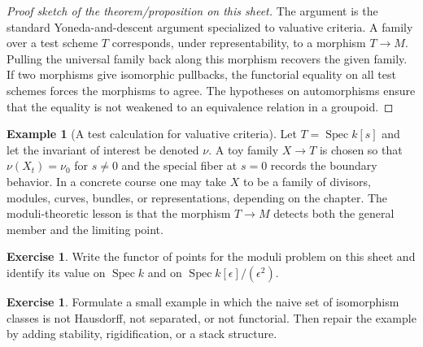 \documentclass[11pt]{amsart}
\theoremstyle{definition}
\newtheorem{example}[theorem]{Example}
\newtheorem{exercise}[theorem]{Exercise}
\newcommand{\Spec}{\operatorname{Spec}}
\begin{document}
\begin{proof}[Proof sketch of the theorem/proposition on this sheet]
The argument is the standard Yoneda-and-descent argument specialized to valuative criteria.  A family over a test scheme $T$ corresponds, under representability, to a morphism $T\to M$.  Pulling the universal family back along this morphism recovers the given family.  If two morphisms give isomorphic pullbacks, the functorial equality on all test schemes forces the morphisms to agree.  The hypotheses on automorphisms ensure that the equality is not weakened to an equivalence relation in a groupoid.
\end{proof}
\begin{example}[A test calculation for valuative criteria]
Let $T=\Spec k[s]$ and let the invariant of interest be denoted $\nu$.  A toy family $X\to T$ is chosen so that $\nu(X_t)=\nu_0$ for $s\ne0$ and the special fiber at $s=0$ records the boundary behavior.  In a concrete course one may take $X$ to be a family of divisors, modules, curves, bundles, or representations, depending on the chapter.  The moduli-theoretic lesson is that the morphism $T\to M$ detects both the general member and the limiting point.
\end{example}
\begin{exercise}
Write the functor of points for the moduli problem on this sheet and identify its value on $\Spec k$ and on $\Spec k[\epsilon]/(\epsilon^2)$.
\end{exercise}
\begin{exercise}
Formulate a small example in which the naive set of isomorphism classes is not Hausdorff, not separated, or not functorial.  Then repair the example by adding stability, rigidification, or a stack structure.
\end{exercise}
\clearpage
\end{document}
